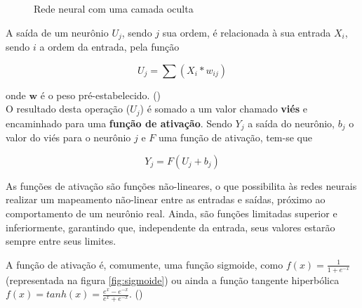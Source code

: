 \documentclass[10pt,a4paper]{article}
\begin{document}
\begin{multicols*}{2}
\begin{figure}[H]
\caption{Rede neural com uma camada oculta}
\label{fig:nn_ex}
\end{figure}
A saída de um neurônio $ U_j $, sendo $ j $ sua ordem, é relacionada à sua entrada $ X_i $, sendo $ i $ a ordem da entrada, pela função

\begin{equation}
 U_j = \sum(X_i * w_{ij})
 \label{eq:neuron}
\end{equation}

onde $ \mathbf{w} $ é o peso pré-estabelecido. (\cite{neuralyst})
\\ O resultado desta operação ($ U_j $) é somado a um valor chamado \textbf{viés} e encaminhado para uma \textbf{função de ativação}. Sendo $ Y_j $ a saída do neurônio, $ b_j $ o valor do viés para o neurônio $ j $ e $ F $ uma função de ativação, tem-se que

\begin{equation}
 Y_j = F(U_j + b_j)
 \label{eq:biasactiv}
\end{equation}

As funções de ativação são funções não-lineares, o que possibilita às redes neurais realizar um mapeamento não-linear entre as entradas e saídas, próximo ao comportamento de um neurônio real. Ainda, são funções limitadas superior e inferiormente, garantindo que, independente da entrada, seus valores estarão sempre entre seus limites. \cite{vas1999artificial}

A função de ativação é, comumente, uma função sigmoide, como $ f(x)=\frac{1}{1+e^{-x}} $ (representada na figura \ref{fig:sigmoide}) ou ainda a função tangente hiperbólica $ f(x)=tanh(x) = \frac{e^{x}-e^{-x}}{e^{x}+e^{-x}} $. (\cite{mlp})


\end{multicols*}
\end{document}
